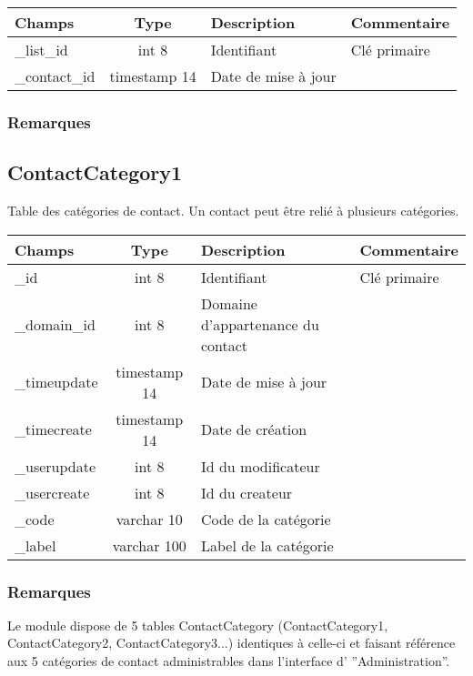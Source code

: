 \begin{tabular}{|p{3cm}|c|p{5.4cm}|p{2.6cm}|}
\hline
\textbf{Champs} & \textbf{Type} & \textbf{Description} & \textbf{Commentaire} \\
\hline
\_list\_id & int 8 & Identifiant & Clé primaire \\
\hline
\_contact\_id & timestamp 14 & Date de mise à jour & \\
\hline
\end{tabular}

\subsubsection{Remarques}


\subsection{ContactCategory1}
Table des catégories de contact. Un contact peut être relié à plusieurs catégories.\\

\begin{tabular}{|p{3cm}|c|p{5.4cm}|p{2.6cm}|}
\hline
\textbf{Champs} & \textbf{Type} & \textbf{Description} & \textbf{Commentaire} \\
\hline
\_id & int 8 & Identifiant & Clé primaire \\
\hline
\_domain\_id & int 8 & Domaine d'appartenance du contact & \\
\hline
\_timeupdate & timestamp 14 & Date de mise à jour & \\
\hline
\_timecreate & timestamp 14 & Date de création & \\
\hline
\_userupdate & int 8 & Id du modificateur & \\
\hline
\_usercreate & int 8 & Id du createur & \\
\hline
\_code & varchar 10 & Code de la catégorie & \\
\hline
\_label & varchar 100 & Label de la catégorie & \\
\hline
\end{tabular}


\subsubsection{Remarques}

Le module \contact dispose de 5 tables ContactCategory (ContactCategory1, ContactCategory2, ContactCategory3...) identiques à celle-ci et faisant référence aux 5 catégories de contact administrables dans l'interface d' ''Administration''.\\

